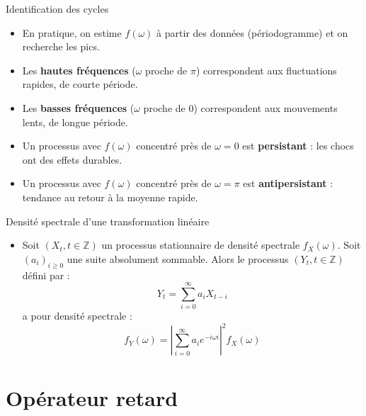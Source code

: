\documentclass[11pt,aspectratio=169]{beamer}
\newcommand{\Z}{\mathbb{Z}}
\begin{document}
\begin{frame}{Identification des cycles}

\begin{itemize}

\item En pratique, on estime $f(\omega)$ à partir des données (périodogramme) et on recherche les pics.\newline

\item Les \textbf{hautes fréquences} ($\omega$ proche de $\pi$) correspondent aux fluctuations rapides, de courte période.\newline

\item Les \textbf{basses fréquences} ($\omega$ proche de $0$) correspondent aux mouvements lents, de longue période.\newline

\item Un processus avec $f(\omega)$ concentré près de $\omega = 0$ est \textbf{persistant} : les chocs ont des effets durables.\newline

\item Un processus avec $f(\omega)$ concentré près de $\omega = \pi$ est \textbf{antipersistant} : tendance au retour à la moyenne rapide.

\end{itemize}

\end{frame}


\begin{frame}{Densité spectrale d'une transformation linéaire}

\begin{itemize}

\item Soit $(X_t, t \in \Z)$ un processus stationnaire de densité spectrale $f_X(\omega)$. Soit $(a_i)_{i \geq 0}$ une suite absolument sommable. Alors le processus $(Y_t, t \in \Z)$ défini par :
  \[
  Y_t = \sum_{i=0}^{\infty} a_i X_{t-i}
  \]
  a pour densité spectrale :
  \[
  f_Y(\omega) = \left|\sum_{i=0}^{\infty} a_i e^{-i\omega i}\right|^2 f_X(\omega)
  \]

\end{itemize}

\end{frame}

\section{Opérateur retard}
\end{document}
